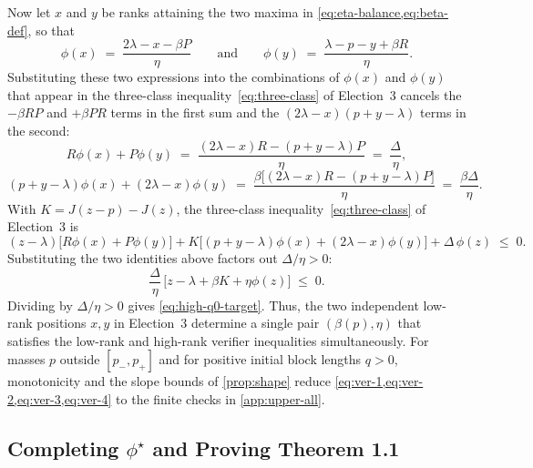 \documentclass[11pt]{article}
\numberwithin{equation}{section}
\theoremstyle{plain}
\theoremstyle{definition}
\newcommand{\1}{\mathbf{1}}
\begin{document}
Now let $x$ and $y$ be ranks attaining the two maxima in \cref{eq:eta-balance,eq:beta-def}, so that
\[
  \phi(x) \;=\; \frac{2\lambda - x - \beta P}{\eta}
  \qquad\text{and}\qquad
  \phi(y) \;=\; \frac{\lambda - p - y + \beta R}{\eta}.
\]
Substituting these two expressions into the combinations of $\phi(x)$ and $\phi(y)$ that appear in the three-class inequality~\eqref{eq:three-class} of Election~3 cancels the $-\beta R P$ and $+\beta P R$ terms in the first sum and the $(2\lambda - x)(p + y - \lambda)$ terms in the second:
\[
  R\phi(x) + P\phi(y) \;=\; \frac{(2\lambda - x)R - (p + y - \lambda)P}{\eta} \;=\; \frac{\Delta}{\eta},
\]
\[
  (p + y - \lambda)\phi(x) + (2\lambda - x)\phi(y) \;=\; \frac{\beta\bigl[(2\lambda - x)R - (p + y - \lambda)P\bigr]}{\eta} \;=\; \frac{\beta\Delta}{\eta}.
\]
With $K = J(z - p) - J(z)$, the three-class inequality~\eqref{eq:three-class} of Election~3 is
\[
  (z - \lambda)\bigl[R\phi(x) + P\phi(y)\bigr] + K\bigl[(p + y - \lambda)\phi(x) + (2\lambda - x)\phi(y)\bigr] + \Delta\,\phi(z) \;\le\; 0.
\]
Substituting the two identities above factors out $\Delta / \eta > 0$:
\[
  \frac{\Delta}{\eta}\,\bigl[z - \lambda + \beta K + \eta\phi(z)\bigr] \;\le\; 0.
\]
Dividing by $\Delta / \eta > 0$ gives \cref{eq:high-q0-target}. Thus, the two independent low-rank positions $x, y$ in Election~3 determine a single pair $(\beta(p), \eta)$ that satisfies the low-rank and high-rank verifier inequalities simultaneously. For masses $p$ outside $[p_-, p_+]$ and for positive initial block lengths $q > 0$, monotonicity and the slope bounds of \cref{prop:shape} reduce \cref{eq:ver-1,eq:ver-2,eq:ver-3,eq:ver-4} to the finite checks in \cref{app:upper-all}.

\subsection{Completing \texorpdfstring{$\phi^\star$}{phi*} and Proving Theorem 1.1}
\label{sec:completing-score}
\end{document}
